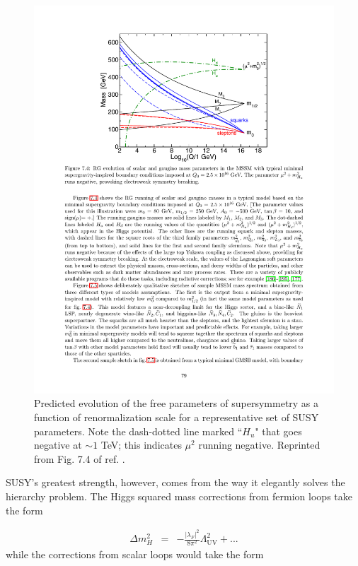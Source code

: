 \documentclass[dissertation.tex]{subfiles}
\begin{document}
\begin{figure}
	\centering
	\includegraphics[scale=1.0]{SUSY_RG_evolution}
	\caption{Predicted evolution of the free parameters of supersymmetry as a function of renormalization scale for a representative set of SUSY parameters.  Note the dash-dotted line marked ``$H_{u}$" that goes negative at $\sim1$ TeV; this indicates $\mu^{2}$ running negative.  Reprinted from Fig. 7.4 of ref. \cite{SUSY_primer}.}
	\label{fig:SUSY_RG_evolution}
\end{figure}

SUSY's greatest strength, however, comes from the way it elegantly solves the hierarchy problem.  The Higgs squared mass corrections from fermion loops take the form \cite{SUSY_primer}

\begin{eqnarray}
\Delta m_{H}^{2} &=& -\frac{|\lambda_{F}|^{2}}{8\pi^{2}}\Lambda_{\mathrm{UV}}^{2} + ...
\label{eq:Higgs_mass_fermion_loop}
\end{eqnarray}
%
while the corrections from scalar loops would take the form \cite{SUSY_primer}
\end{document}
